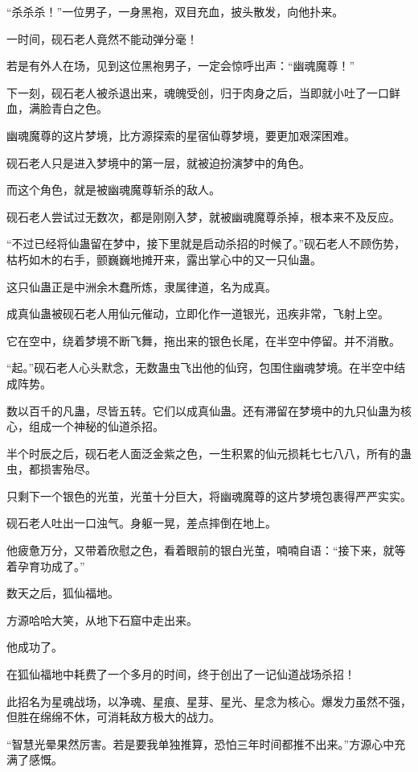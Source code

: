 \begin{this_body}
“杀杀杀！”一位男子，一身黑袍，双目充血，披头散发，向他扑来。

一时间，砚石老人竟然不能动弹分毫！

若是有外人在场，见到这位黑袍男子，一定会惊呼出声：“幽魂魔尊！”

下一刻，砚石老人被杀退出来，魂魄受创，归于肉身之后，当即就小吐了一口鲜血，满脸青白之色。

幽魂魔尊的这片梦境，比方源探索的星宿仙尊梦境，要更加艰深困难。

砚石老人只是进入梦境中的第一层，就被迫扮演梦中的角色。

而这个角色，就是被幽魂魔尊斩杀的敌人。

砚石老人尝试过无数次，都是刚刚入梦，就被幽魂魔尊杀掉，根本来不及反应。

“不过已经将仙蛊留在梦中，接下里就是启动杀招的时候了。”砚石老人不顾伤势，枯朽如木的右手，颤巍巍地摊开来，露出掌心中的又一只仙蛊。

这只仙蛊正是中洲余木蠢所炼，隶属律道，名为成真。

成真仙蛊被砚石老人用仙元催动，立即化作一道银光，迅疾非常，飞射上空。

它在空中，绕着梦境不断飞舞，拖出来的银色长尾，在半空中停留。并不消散。

“起。”砚石老人心头默念，无数蛊虫飞出他的仙窍，包围住幽魂梦境。在半空中结成阵势。

数以百千的凡蛊，尽皆五转。它们以成真仙蛊。还有滞留在梦境中的九只仙蛊为核心，组成一个神秘的仙道杀招。

半个时辰之后，砚石老人面泛金紫之色，一生积累的仙元损耗七七八八，所有的蛊虫，都损害殆尽。

只剩下一个银色的光茧，光茧十分巨大，将幽魂魔尊的这片梦境包裹得严严实实。

砚石老人吐出一口浊气。身躯一晃，差点摔倒在地上。

他疲惫万分，又带着欣慰之色，看着眼前的银白光茧，喃喃自语：“接下来，就等着孕育功成了。”

数天之后，狐仙福地。

方源哈哈大笑，从地下石窟中走出来。

他成功了。

在狐仙福地中耗费了一个多月的时间，终于创出了一记仙道战场杀招！

此招名为星魂战场，以净魂、星痕、星芽、星光、星念为核心。爆发力虽然不强，但胜在绵绵不休，可消耗敌方极大的战力。

“智慧光晕果然厉害。若是要我单独推算，恐怕三年时间都推不出来。”方源心中充满了感慨。


\end{this_body}
